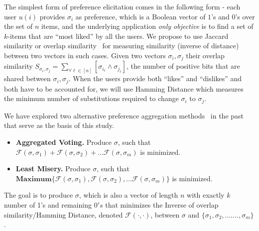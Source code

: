 \documentclass[11pt]{article}
\begin{document}
The simplest form of preference elicitation comes in the following form - each user $u(i)$ provides $\sigma_i$ as preference, which is a Boolean vector of $1$'s and $0$'s over the set of $n$ items, and the underlying application \textit{only objective} is to find a set of $k$-items that are ``most liked'' by all the users. We propose to use Jaccard similarity or overlap similarity~\cite{roy2014exploiting} for measuring similarity (inverse of distance) between two vectors in such cases. Given two vectors $\sigma_i, \sigma_j$ their overlap similarity $S_{\sigma_i, \sigma_j} = \sum_{\forall \ell \in [n]} [\sigma_{i_\ell} \land \sigma_{j_\ell}]$, the number
of positive bits that are shared between $\sigma_i, \sigma_j$. When  the users provide both ``likes'' and ``dislikes'' and both have to be accounted for, we will use Hamming Distance  which measures the minimum number of substitutions required to change $\sigma_i$ to  $\sigma_j$. 

We have explored two alternative preference aggregation methods~\cite{amer2009group, roy2014exploiting} in the past that serve as the basis of this study.
\begin{itemize}
    \item \textbf{Aggregated Voting.} Produce $\sigma$, such that $\mathcal{F}(\sigma,\sigma_1) + \mathcal{F}(\sigma,\sigma_2) +\ldots \mathcal{F}(\sigma,\sigma_m)$ is minimized.
     \item \textbf{Least Misery.} Produce $\sigma$, such that $\mathbf{Maximum}\{\mathcal{F}(\sigma,\sigma_1), \mathcal{F}(\sigma,\sigma_2),\ldots \mathcal{F}(\sigma,\sigma_m)\}$ is minimized.
\end{itemize}
The goal is to produce $\sigma$, which is also a vector of length $n$ with exactly $k$ number of 1's and remaining $0's$ that minimizes the Inverse of overlap similarity/Hamming Distance, denoted $\mathcal{F}(\cdot,\cdot)$, between $\sigma$ and $\{\sigma_1,\sigma_2,....\ldots,\sigma_m\}$.
\end{document}
